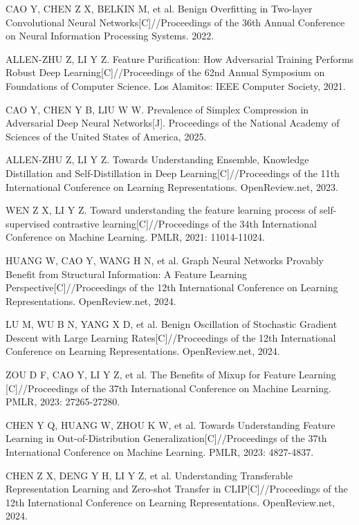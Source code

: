  CAO Y, CHEN Z X, BELKIN M, et al. Benign Overfitting in Two-layer Convolutional Neural Networks[C]//Proceedings of the 36th Annual Conference on Neural Information Processing Systems. 2022.

 ALLEN-ZHU Z, LI Y Z. Feature Purification: How Adversarial Training Performs Robust Deep Learning[C]//Proceedings of the 62nd Annual Symposium on Foundations of Computer Science. Los Alamitos: IEEE Computer Society, 2021.

 CAO Y, CHEN Y B, LIU W W. Prevalence of Simplex Compression in Adversarial Deep Neural Networks[J]. Proceedings of the National Academy of Sciences of the United States of America, 2025.

 ALLEN-ZHU Z, LI Y Z. Towards Understanding Ensemble, Knowledge Distillation and Self-Distillation in Deep Learning[C]//Proceedings of the 11th International Conference on Learning Representations. OpenReview.net, 2023.

 WEN Z X, LI Y Z. Toward understanding the feature learning process of self-supervised contrastive learning[C]//Proceedings of the 34th International Conference on Machine Learning. PMLR, 2021: 11014-11024.

 HUANG W, CAO Y, WANG H N, et al. Graph Neural Networks Provably Benefit from Structural Information: A Feature Learning Perspective[C]//Proceedings of the 12th International Conference on Learning Representations. OpenReview.net, 2024.

 LU M, WU B N, YANG X D, et al. Benign Oscillation of Stochastic Gradient Descent with Large Learning Rates[C]//Proceedings of the 12th International Conference on Learning Representations. OpenReview.net, 2024.

 ZOU D F, CAO Y, LI Y Z, et al. The Benefits of Mixup for Feature Learning [C]//Proceedings of the 37th International Conference on Machine Learning. PMLR, 2023: 27265-27280.

 CHEN Y Q, HUANG W, ZHOU K W, et al. Towards Understanding Feature Learning in Out-of-Distribution Generalization[C]//Proceedings of the 37th International Conference on Machine Learning. PMLR, 2023: 4827-4837.

 CHEN Z X, DENG Y H, LI Y Z, et al. Understanding Transferable Representation Learning and Zero-shot Transfer in CLIP[C]//Proceedings of the 12th International Conference on Learning Representations. OpenReview.net, 2024.

